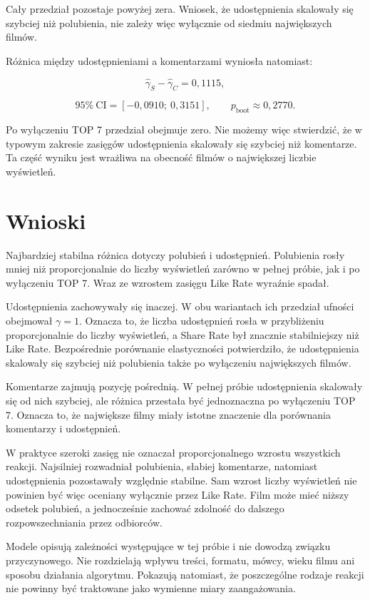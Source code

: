 \documentclass[12pt,a4paper]{article}
\begin{document}
Cały przedział pozostaje powyżej zera. Wniosek, że udostępnienia skalowały się szybciej niż polubienia, nie zależy więc wyłącznie od siedmiu największych filmów.

Różnica między udostępnieniami a komentarzami wyniosła natomiast:

\[
\widehat{\gamma}_{S}-\widehat{\gamma}_{C}
=0{,}1115,
\]

\[
95\%\ \mathrm{CI}=[-0{,}0910;\ 0{,}3151],
\qquad
p_{\mathrm{boot}}\approx0{,}2770.
\]

Po wyłączeniu TOP 7 przedział obejmuje zero. Nie możemy więc stwierdzić, że w typowym zakresie zasięgów udostępnienia skalowały się szybciej niż komentarze. Ta część wyniku jest wrażliwa na obecność filmów o największej liczbie wyświetleń.

\section{Wnioski}

Najbardziej stabilna różnica dotyczy polubień i udostępnień. Polubienia rosły mniej niż proporcjonalnie do liczby wyświetleń zarówno w pełnej próbie, jak i po wyłączeniu TOP 7. Wraz ze wzrostem zasięgu Like Rate wyraźnie spadał.

Udostępnienia zachowywały się inaczej. W obu wariantach ich przedział ufności obejmował $\gamma=1$. Oznacza to, że liczba udostępnień rosła w przybliżeniu proporcjonalnie do liczby wyświetleń, a Share Rate był znacznie stabilniejszy niż Like Rate. Bezpośrednie porównanie elastyczności potwierdziło, że udostępnienia skalowały się szybciej niż polubienia także po wyłączeniu największych filmów.

Komentarze zajmują pozycję pośrednią. W pełnej próbie udostępnienia skalowały się od nich szybciej, ale różnica przestała być jednoznaczna po wyłączeniu TOP 7. Oznacza to, że największe filmy miały istotne znaczenie dla porównania komentarzy i udostępnień.

W praktyce szeroki zasięg nie oznaczał proporcjonalnego wzrostu wszystkich reakcji. Najsilniej rozwadniał polubienia, słabiej komentarze, natomiast udostępnienia pozostawały względnie stabilne. Sam wzrost liczby wyświetleń nie powinien być więc oceniany wyłącznie przez Like Rate. Film może mieć niższy odsetek polubień, a jednocześnie zachować zdolność do dalszego rozpowszechniania przez odbiorców.

Modele opisują zależności występujące w tej próbie i nie dowodzą związku przyczynowego. Nie rozdzielają wpływu treści, formatu, mówcy, wieku filmu ani sposobu działania algorytmu. Pokazują natomiast, że poszczególne rodzaje reakcji nie powinny być traktowane jako wymienne miary zaangażowania.
\end{document}
